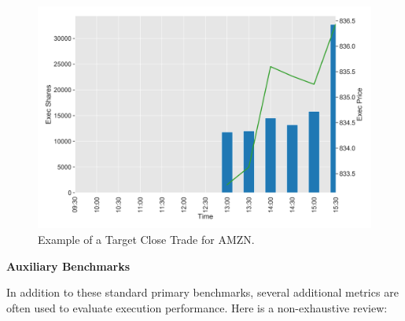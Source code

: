 	\begin{figure}[!ht]
	\centering
	\includegraphics[width=\textwidth]{chapters/chapter_exec_models/figures/close.png} 
	\caption{Example of a Target Close Trade for AMZN. \label{fig:close}}
	\end{figure}


\noindent\textbf{Auxiliary Benchmarks} \twomedskip


In addition to these standard primary benchmarks, several additional metrics are often used to evaluate execution performance. Here is a non-exhaustive review:


